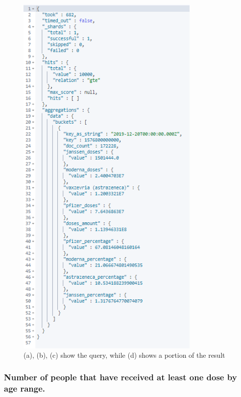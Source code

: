 \documentclass{article}[IEEEtran]
\begin{document}
\begin{figure}[H]
\begin{center}
\begin{minipage}[b]{0.4\textwidth}
    \includegraphics[width=0.8\textwidth, frame]{Answer_Query_2BIS.png}
     \subcaption{}
  \end{minipage}
  \caption{(a), (b), (c) show the query, while (d) shows a portion of the result}
\end{center}
\end{figure}

\subsubsection{Number of people that have received at least one dose by age range.}\label{ssec:q5}
\end{document}
